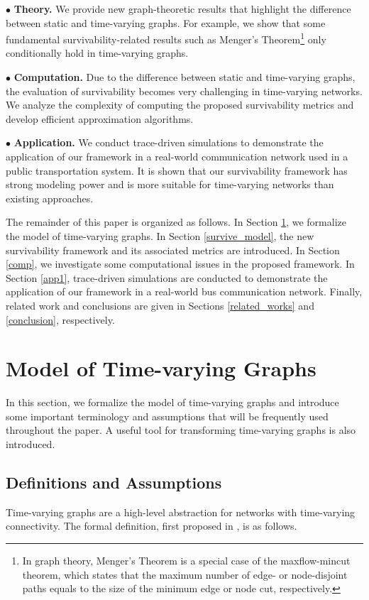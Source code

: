\documentclass[10pt, conference, letterpaper]{IEEEtran}
\begin{document}
\noindent $\bullet$ {\textbf{Theory.} We provide new graph-theoretic results that highlight the difference between static and time-varying graphs. For example, we show that some fundamental survivability-related results such as Menger's Theorem\footnote{In graph theory, Menger's Theorem is a special case of the maxflow-mincut theorem, which states that the maximum number of edge- or node-disjoint paths equals to the size of the minimum edge or node cut, respectively.} only conditionally hold in time-varying graphs. }

\noindent $\bullet$ {\textbf{Computation.} Due to the difference between static and time-varying graphs, the evaluation of survivability becomes very challenging in time-varying networks. We analyze the complexity of computing the proposed survivability metrics and develop efficient approximation algorithms.}

\noindent $\bullet$ {\textbf{Application.} We conduct trace-driven simulations to demonstrate the application of our framework in a real-world communication network used in a public transportation system. It is shown that our survivability framework has strong modeling power and is more suitable for time-varying networks than existing approaches.}

The remainder of this paper is organized as follows. In Section \ref{graph_model}, we formalize the model of time-varying graphs. In Section \ref{survive_model}, the new survivability framework and its associated metrics are introduced. In Section \ref{comp}, we investigate some computational issues in the proposed framework. In Section \ref{app1}, trace-driven simulations are conducted to demonstrate the application of our framework in a real-world bus communication network. Finally, related work and conclusions are given in Sections \ref{related_works} and \ref{conclusion}, respectively.
\section{Model of Time-varying Graphs}\label{graph_model}
In this section, we formalize the model of time-varying graphs and introduce some important terminology and assumptions that will be frequently used throughout the paper. A useful tool for transforming time-varying graphs is also introduced.
\subsection{Definitions and Assumptions}\label{def}
Time-varying graphs are a high-level abstraction for networks with time-varying connectivity. The formal definition, first proposed in \cite{TVG2}, is as follows.
\end{document}

